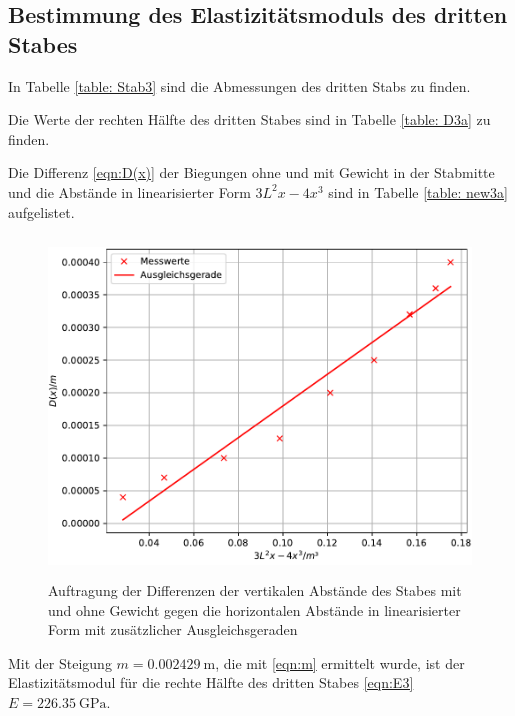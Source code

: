 \subsection{Bestimmung des Elastizitätsmoduls des dritten Stabes}
In Tabelle \ref{table: Stab3} sind die Abmessungen des dritten Stabs zu finden.

\noindent Die Werte der rechten Hälfte des dritten Stabes sind in Tabelle \ref{table: D3a} zu finden.

\noindent Die Differenz \eqref{eqn:D(x)} der Biegungen ohne und mit Gewicht in der Stabmitte
und die Abstände in linearisierter Form $3L^2x-4x^3$ sind in Tabelle \ref{table: new3a} aufgelistet.

\begin{figure}

  \centering
  \includegraphics[width=12cm, height=9cm]{./plots/Stange3a.pdf}
  \caption{Auftragung der Differenzen der vertikalen Abstände des Stabes mit und ohne Gewicht gegen die horizontalen Abstände in linearisierter Form mit zusätzlicher Ausgleichsgeraden}
  \label{fig:plot3a}
\end{figure}
\noindent Mit der Steigung $m = \SI{0.002429}{\meter}$, die mit \eqref{eqn:m} %
ermittelt wurde, ist der Elastizitätsmodul für die rechte
Hälfte des dritten Stabes \eqref{eqn:E3} $E =\SI{226.35}{\giga\pascal}$.
\newpage

